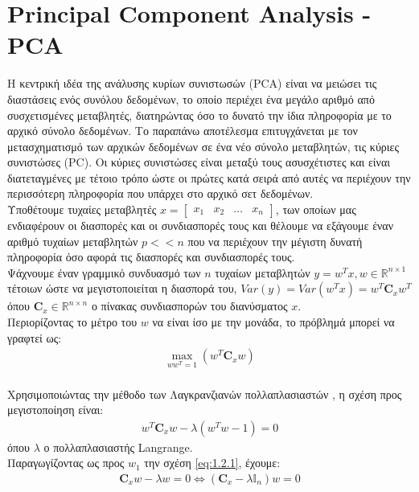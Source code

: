 \section{\en Principal Component Analysis - PCA} \label{sec:1.4}
\justifying
\gr Η κεντρική ιδέα της ανάλυσης κυρίων συνιστωσών (\en PCA)\cite{pca:3} \gr είναι να μειώσει τις διαστάσεις ενός συνόλου δεδομένων, το οποίο περιέχει ένα μεγάλο αριθμό από συσχετισμένες μεταβλητές, διατηρώντας όσο το δυνατό την ίδια πληροφορία με το αρχικό σύνολο δεδομένων. Το παραπάνω αποτέλεσμα επιτυγχάνεται με τον μετασχηματισμό των αρχικών δεδομένων σε ένα νέο σύνολο μεταβλητών, τις κύριες συνιστώσες (\en PC). \gr Οι κύριες συνιστώσες είναι μεταξύ τους ασυσχέτιστες και είναι διατεταγμένες με τέτοιο τρόπο ώστε οι πρώτες κατά σειρά από αυτές να περιέχουν την περισσότερη πληροφορία που υπάρχει στο αρχικό σετ δεδομένων.
\\[0.5\baselineskip]
Υποθέτουμε τυχαίες μεταβλητές 
\en $x =\begin{bmatrix} x_1 & x_2 & \ldots & x_n \end{bmatrix}$\gr , των οποίων μας ενδιαφέρουν οι διασπορές και οι συνδιασπορές τους και θέλουμε να εξάγουμε έναν αριθμό τυχαίων μεταβλητών \en $p << n $ \gr που να περιέχουν την μέγιστη δυνατή πληροφορία όσο αφορά τις διασπορές και συνδιασπορές τους.
\\[0.5\baselineskip]
Ψάχνουμε έναν γραμμικό συνδυασμό των \en$n$ \gr τυχαίων μεταβλητών \en$y = w^T x, w \in \mathbb{R}^{n \times 1}$ \gr τέτοιων ώστε να μεγιστοποιείται η διασπορά του, 
\en$Var(y) = Var(w^T x) = w^T \mathbf{C}_x w^T$ \gr όπου \en $\mathbf{C}_x \in \mathbb{R}^{n \times n}$ \gr ο πίνακας συνδιασπορών του διανύσματος \en $x$. 
\\ \gr
Περιορίζοντας το μέτρο του \en $w$ \gr να είναι ίσο με την μονάδα, το πρόβλημά μπορεί να γραφτεί ως:\en
\begin{align*}
    \max_{w w^T = 1} \left( w^T \mathbf{C}_x w \right)
\end{align*}
\\
Χρησιμοποιώντας την μέθοδο των Λαγκρανζιανών πολλαπλασιαστών \cite{langrage:4}, η σχέση προς μεγιστοποίηση είναι: \en
\begin{align} \label{eq:1.2.1}
w^T \mathbf{C}_x w - \lambda \left ( w^T w -1 \right ) = 0
\end{align}
\gr όπου $λ$ ο πολλαπλασιαστής \en Langrange. \gr 
\\
Παραγωγίζοντας ως προς \en $w_1$ \gr την σχέση \eqref{eq:1.2.1}, έχουμε: \en
\begin{align} \label{eq:1.2.2}
    \mathbf{C}_x w - \lambda w = 0 \Leftrightarrow 
    \left ( \mathbf{C}_x - \lambda \mathbb{I}_n \right ) w = 0
\end{align} \gr
